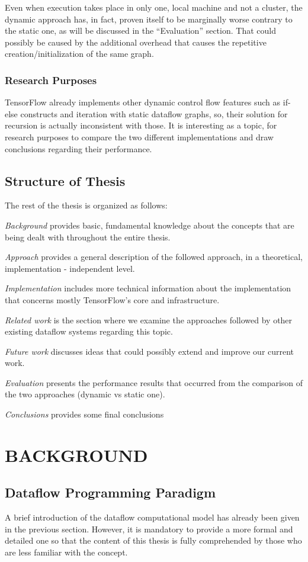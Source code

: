 \documentclass[ack,preface]{dithesis}
\begin{document}
Even when execution takes place in only one, local machine and not a cluster, the dynamic approach has, in fact, proven itself to be marginally worse contrary to the static one, as will be discussed in the “Evaluation” section. That could possibly be caused by the additional overhead that causes the repetitive creation/initialization of the same graph.


    \subsection{Research Purposes}
	TensorFlow already implements other dynamic control flow features such as if-else constructs and iteration with static dataflow graphs, so, their solution for recursion is actually inconsistent with those. It is interesting as a topic, for research purposes to compare the two different implementations and draw conclusions regarding their performance. 

    \section{Structure of Thesis}
The rest of the thesis is organized as follows:

\textit{Background} provides basic, fundamental knowledge about the concepts that are being dealt with throughout the entire thesis.

\textit{Approach} provides a general description of the followed approach, in a theoretical, implementation - independent level.

\textit{Implementation} includes more technical information about the implementation that concerns mostly TensorFlow's core and infrastructure.

\textit{Related work} is the section where we examine the approaches followed by other existing dataflow systems regarding this topic.

\textit{Future work} discusses ideas that could possibly extend and improve our current work.

\textit{Evaluation} presents the performance results that occurred from the comparison of the two approaches (dynamic vs static one).

\textit{Conclusions} provides some final conclusions


\chapter{BACKGROUND}
    \section{Dataflow Programming Paradigm}
A brief introduction of the dataflow computational model has already been given in the previous section. However, it is mandatory to provide a more formal and detailed one so that the content of this thesis is fully comprehended by those who are less familiar with the concept.
\end{document}
